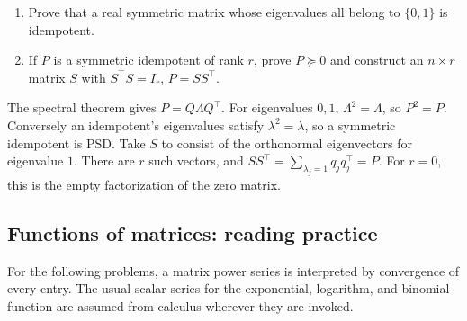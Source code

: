 \begin{problem}\label{ex:09:projector-factor}
\begin{enumerate}
\item Prove that a real symmetric matrix whose eigenvalues all belong
to \(\{0,1\}\) is idempotent.
\item If \(P\) is a symmetric idempotent of rank \(r\), prove \(P\succeq0\)
and construct an \(n\times r\) matrix \(S\) with
\(S^\top S=I_r\), \(P=SS^\top\).
\end{enumerate}
\end{problem}
\begin{solution}
The spectral theorem gives \(P=Q\Lambda Q^\top\).
For eigenvalues \(0,1\), \(\Lambda^2=\Lambda\), so \(P^2=P\).
Conversely an idempotent's eigenvalues satisfy \(\lambda^2=\lambda\),
so a symmetric idempotent is PSD.
Take \(S\) to consist of the orthonormal eigenvectors for eigenvalue \(1\).
There are \(r\) such vectors, and
\(SS^\top=\sum_{\lambda_j=1}q_jq_j^\top=P\).
For \(r=0\), this is the empty factorization of the zero matrix.
\end{solution}

\subsection*{Functions of matrices: reading practice}
For the following problems, a matrix power series is interpreted by
convergence of every entry. The usual scalar series for the exponential,
logarithm, and binomial function are assumed from calculus wherever they
are invoked.

